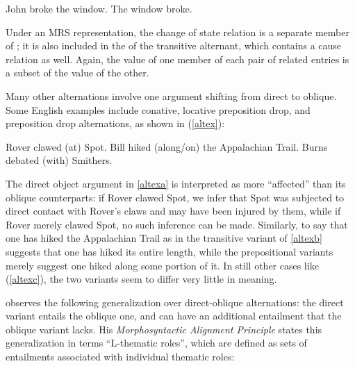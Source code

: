 \documentclass[output=paper
                ,modfonts
                ,nonflat
	        ,collection
	        ,collectionchapter
	        ,collectiontoclongg
 	        ,biblatex
                ,babelshorthands
                ,newtxmath
                ,draftmode
                ,colorlinks, citecolor=brown
]{./langsci/langscibook}
\begin{document}
\begin{exe}
\ex\label{caus-inch}
\begin{xlist}
	\ex\label{caus-inch-a}John broke the window.
	\ex\label{caus-inch-b}The window broke.
\end{xlist}	
\end{exe}

Under an MRS representation, the change of state relation is a separate member of \rels; it is also included in the \rels of the transitive alternant, which contains a cause relation as well.
Again, the \rels value of one member of each pair of related entries is a subset of the \rels value of the other.

Many other alternations involve one argument shifting from direct to oblique.
Some English examples include conative, locative preposition drop, and  preposition drop alternations, as shown in (\ref{altex}):

\begin{exe}\ex\label{altex}
\begin{xlist}
\ex \label{altexa} Rover clawed (at) Spot. 
\ex \label{altexb} Bill hiked (along/on) the Appalachian Trail.
\ex \label{altexc} Burns debated (with) Smithers.
\end{xlist}
\end{exe}

\noindent
The direct object argument in \ref{altexa} is interpreted as more ``affected'' than its oblique counterparts:  if Rover clawed Spot, we infer that Spot was subjected to direct contact with Rover's claws and may have been injured by them, while if Rover merely clawed  Spot, no such inference can be made.
Similarly, to say that one has hiked the Appalachian Trail as in the transitive variant of \ref{altexb} suggests that one has hiked its entire length, while the prepositional variants merely suggest one hiked along some portion of it.  In still other cases like (\ref{altexc}), the two variants seem to differ very little in meaning.  


\citet{Beavers2010} observes the following generalization over direct-oblique alternations:  the direct variant entails the oblique one, and can have an additional entailment that the oblique variant lacks.  
His \emph{Morphosyntactic Alignment Principle}  states this generalization in terms ``L-thematic roles'', which are defined as sets of entailments associated with individual thematic roles:   
\end{document}
